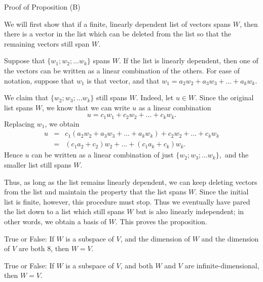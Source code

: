 \begin{edXshowhide}{Proof of Proposition (B)}

We will first show that if a finite, linearly dependent list of vectors spans $W$, then
there is a vector in the list which can be deleted from the list so that the 
remaining vectors still span $W$.  

Suppose that $\{w_1; w_2; \ldots w_k\}$ spans $W$.  If the list is linearly dependent, then one of the
vectors can be written as a linear combination of the others.  For ease of notation, suppose that $w_1$
is that vector, and that $w_1 = a_2w_2 + a_3w_3 +\ldots + a_kw_k$.  

We claim that $\{w_2; w_3; \ldots w_k\}$ still spans $W$.  Indeed, let $u \in W$.  Since the original
list spans $W$, we know that we can write $u$ as a linear combination
\[u = c_1w_1 + c_2w_2 + \ldots + c_kw_k.\]
Replacing $w_1$, we obtain
\[
\begin{array}{rcl} u & = & c_1(a_2w_2 + a_3w_3 +\ldots + a_kw_k) + c_2w_2 + \ldots + c_kw_k  \\
& = & (c_1a_2+c_2)w_2 + \ldots + (c_1a_k + c_k)w_k. 
\end{array}
\]
Hence $u$ can be written as a linear combination of just $\{w_2; w_3; \ldots w_k\},$
and the smaller list still spans $W$.  

Thus, as long as the list remains linearly dependent, we can keep deleting vectors from the list
and maintain the property that the list spans $W$.  Since the initial list is finite, however,
this procedure must stop.  Thus we eventually have pared the list down to a list which still spans
$W$ but is also linearly independent; in other words, we obtain a basis of $W$.  This proves the
proposition.

\end{edXshowhide}



\endedxtext

\endedxvertical







True or False: If $W$ is a subspace of $V$, and the dimension of $W$ and the dimension of $V$ are both 8,
then $W = V$.  


\edXsolution{
}

\endedxproblem


True or False: If $W$ is a subspace of $V$, and both $W$ and $V$ are infinite-dimensional,
then $W=V$.  


\edXsolution{
}

\endedxproblem


\endedxvertical

